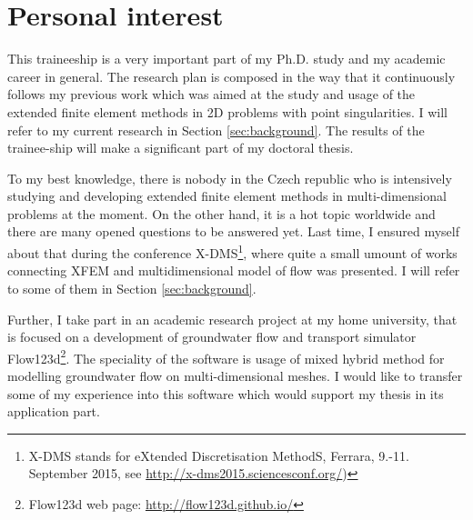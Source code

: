\documentclass{sna}
\begin{document}


\section{Personal interest}
This traineeship is a very important part of my Ph.D. study and my academic career in general.
The research plan is composed in the way that it continuously follows my previous work which was
aimed at the study and usage of the extended finite element methods in 2D problems with point singularities.
I will refer to my current research in Section \ref{sec:background}.
The results of the trainee-ship will make a significant part of my doctoral thesis.

To my best knowledge, there is nobody in the Czech republic who is intensively studying and developing extended finite element
methods in multi-dimensional problems at the moment. On the other hand, it is a hot topic worldwide and there
are many opened questions to be answered yet. Last time, I ensured myself about that during the conference X-DMS\footnote{X-DMS stands for eXtended 
Discretisation MethodS, Ferrara, 9.-11. September 2015, see \url{http://x-dms2015.sciencesconf.org/})}, where
quite a small umount of works connecting XFEM and multidimensional model of flow was presented. 
I will refer to some of them in Section \ref{sec:background}.

Further, I take part in an academic research project at my home university, that is focused on a development
of groundwater flow and transport simulator Flow123d\footnote{Flow123d web page: \url{http://flow123d.github.io/}}. 
The speciality of the software is usage of mixed hybrid method
for modelling groundwater flow on multi-dimensional meshes. I would like to transfer some of my experience
into this software which would support my thesis in its application part.
\end{document}
